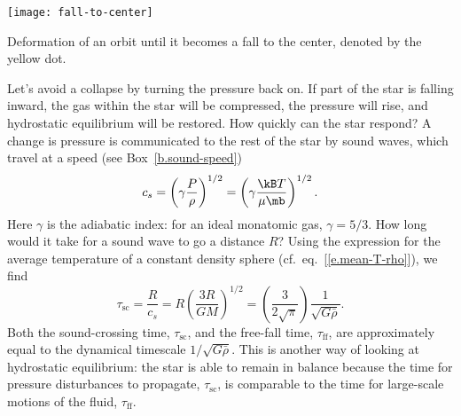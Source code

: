 \begin{marginfigure}
\texttt{[image: fall-to-center]}
\caption[Fall to center]{\label{f.fall-to-center} Deformation of an orbit until it becomes a fall to the center, denoted by the yellow dot.}
\end{marginfigure}

Let's avoid a collapse by turning the pressure back on.  If part of the star is falling inward, the gas within the star will be compressed, the pressure will rise, and hydrostatic equilibrium will be restored.  How quickly can the star respond? A change is pressure is communicated to the rest of the star by sound waves, which travel at a speed (see Box~\ref{b.sound-speed})
\begin{equation}\label{e.speed-of-sound}
c_{s} = \left(\gamma\frac{P}{\rho}\right)^{1/2}
	= \left(\gamma\frac{\kB T}{\mu\mb}\right)^{1/2}.
\end{equation}
Here $\gamma$ is the adiabatic index: for an ideal monatomic gas, $\gamma = 5/3$.  How long would it take for a sound wave to go a distance $R$?  Using the expression for the average temperature of a constant density sphere (cf.~eq.~[\ref{e.mean-T-rho}]), we find
\[
	\tau_{\mathrm{sc}} = \frac{R}{c_{s}} = R\left(\frac{3R}{GM}\right)^{1/2}
		= \left(\frac{3}{2\sqrt{\pi}}\right)\frac{1}{\sqrt{G\bar{\rho}}}.
\]
Both the sound-crossing time, $\tau_{\mathrm{sc}}$, and the free-fall time, $\tau_{\mathrm{ff}}$, are approximately equal to the dynamical timescale $1/\sqrt{G\bar{\rho}}$.  This is another way of looking at hydrostatic equilibrium: the star is able to remain in balance because the time for pressure disturbances to propagate, $\tau_{\mathrm{sc}}$, is comparable to the time for large-scale motions of the fluid, $\tau_{\mathrm{ff}}$.

